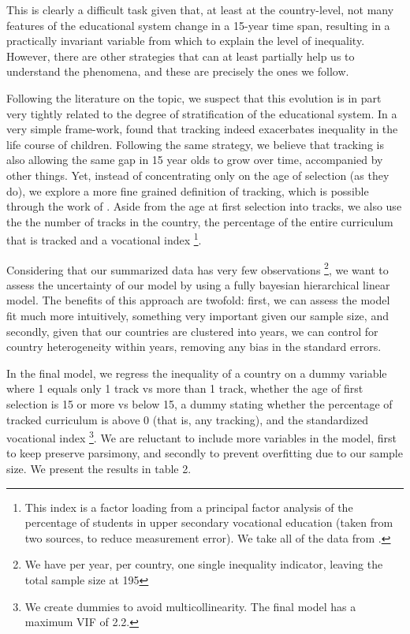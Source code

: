 \documentclass[11pt, a4paper]{article}\usepackage[]{graphicx}\usepackage[]{color}
\begin{document}
This is clearly a difficult task given that, at least at the country-level, not many features of the educational system change in a 15-year time span, resulting in a practically invariant variable from which to explain the level of inequality. However, there are other strategies that can at least partially help us to understand the phenomena, and these are precisely the ones we follow.

Following the literature on the topic, we suspect that this evolution is in part very tightly related to the degree of stratification of the educational system. In a very simple frame-work, \citet{hanushek_woesmann_tracking} found that tracking indeed exacerbates inequality in the life course of children. Following the same strategy, we believe that tracking is also allowing the same gap in 15 year olds to grow over time, accompanied by other things. Yet, instead of concentrating only on the age of selection (as they do), we explore a more fine grained definition of tracking, which is possible through the work of \citet{bol2013}. Aside from the age at first selection into tracks, we also use the the number of tracks in the country, the percentage of the entire curriculum that is tracked and a vocational index \footnote{This index is a factor loading from a principal factor analysis of the percentage of students in upper secondary vocational education (taken from two sources, to reduce measurement error). We take all of the data from \citet{bol2013}.}.

Considering that our summarized data has very few observations \footnote{We have per year, per country, one single inequality indicator, leaving the total sample size at 195}, we want to assess the uncertainty of our model by using a fully bayesian hierarchical linear model. The benefits of this approach are twofold: first, we can assess the model fit much more intuitively, something very important given our sample size, and secondly, given that our countries are clustered into years, we can control for country heterogeneity within years, removing any bias in the standard errors.

In the final model, we regress the inequality of a country on a dummy variable where 1 equals only 1 track vs more than 1 track, whether the age of first selection is 15 or more vs below 15, a dummy stating whether the percentage of tracked curriculum is above 0 (that is, any tracking), and the standardized vocational index \footnote{We create dummies to avoid multicollinearity. The final model has a maximum VIF of 2.2.}. We are reluctant to include more variables in the model, first to keep preserve parsimony, and secondly to prevent overfitting due to our sample size. We present the results in table 2.
\end{document}
